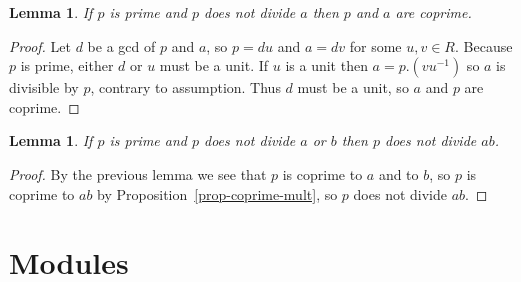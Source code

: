 \documentclass{amsart}
\renewcommand{\:}{\colon}
\newtheorem{lemma}[theorem]{Lemma}
\theoremstyle{definition}
\begin{document}
\begin{lemma}
 If $p$ is prime and $p$ does not divide $a$ then $p$ and $a$ are
 coprime.
\end{lemma}
\begin{proof}
 Let $d$ be a gcd of $p$ and $a$, so $p=du$ and $a=dv$ for some
 $u,v\in R$.  Because $p$ is prime, either $d$ or $u$ must be a unit.
 If $u$ is a unit then $a=p.(vu^{-1})$ so $a$ is divisible by $p$,
 contrary to assumption.  Thus $d$ must be a unit, so $a$ and $p$ are
 coprime.   
\end{proof}

\begin{lemma}\label{lem-irr-prime}
 If $p$ is prime and $p$ does not divide $a$ or $b$ then $p$ does not
 divide $ab$.
\end{lemma}
\begin{proof}
 By the previous lemma we see that $p$ is coprime to $a$ and to $b$,
 so $p$ is coprime to $ab$ by Proposition~\ref{prop-coprime-mult}, so
 $p$ does not divide $ab$.
\end{proof}



\section{Modules}
\end{document}
